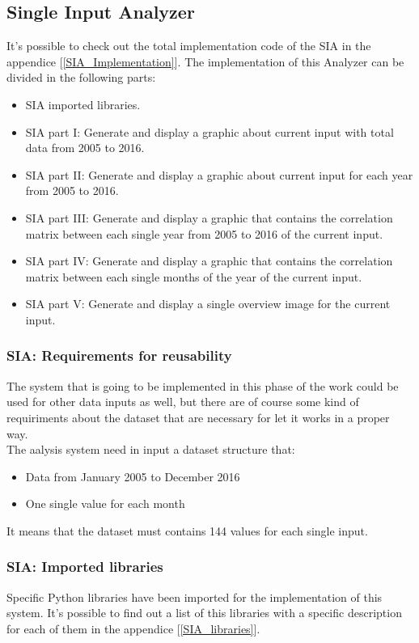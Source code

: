 \newpage
\subsection{Single Input Analyzer}
It's possible to check out the total implementation code of the SIA in the appendice  [\ref{SIA_Implementation}].
The implementation of this Analyzer can be divided in the following parts:
\begin{itemize}
\item SIA imported libraries. 
\item SIA part I: Generate and display a graphic about current input with total data from 2005 to 2016.
\item SIA part II: Generate and display a graphic about current input for each year from 2005 to 2016.
\item SIA part III: Generate and display a graphic that contains the correlation matrix between each single year from 2005 to 2016 of the current input.
\item SIA part IV: Generate and display a graphic that contains the correlation matrix between each single months of the year of the current input.
\item SIA part V: Generate and display a single overview image for the current input.
\end{itemize}

\subsubsection{SIA: Requirements for reusability}
The system that is going to be implemented in this phase of the work could be used for other data inputs as well, but there are of course some kind of requiriments about the dataset that are necessary for let it works in a proper way.\\
The aalysis system need in input a dataset structure that:
\begin{itemize}
\item Data from January 2005 to December 2016
\item One single value for each month
\end{itemize}
It means that the dataset must contains 144 values for each single input.

\subsubsection{SIA: Imported libraries}
Specific Python libraries have been imported for the implementation of this system.
It's possible to find out a list of this libraries with a specific description for each of them in the appendice [\ref{SIA_libraries}].

